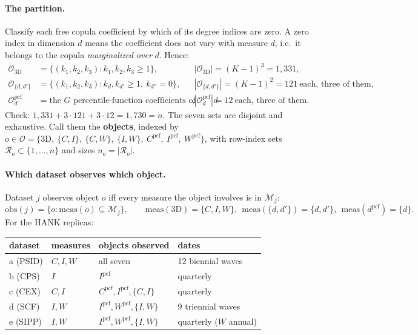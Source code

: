 \documentclass[11pt]{article}
\newcommand{\pcf}{\mathrm{pcf}}
\newcommand{\obs}{\mathrm{obs}}
\begin{document}
\paragraph{The partition.} Classify each free copula coefficient by which of its
degree indices are zero. A zero index in dimension $d$ means the coefficient
does not vary with measure $d$, i.e.\ it belongs to the copula
\emph{marginalized over} $d$. Hence:
\begin{equation}
\begin{aligned}
  \mathcal{O}_{\mathrm{3D}}  &= \{(k_1,k_2,k_3): k_1,k_2,k_3 \ge 1\}, &&|\mathcal{O}_{\mathrm{3D}}| = (K-1)^3 = 1{,}331, \\
  \mathcal{O}_{\{d,d'\}}     &= \{(k_1,k_2,k_3): k_d,k_{d'} \ge 1,\ k_{d''} = 0\}, &&|\mathcal{O}_{\{d,d'\}}| = (K-1)^2 = 121 \ \text{each, three of them},\\
  \mathcal{O}_{d}^{\pcf}     &= \text{the $G$ percentile-function coefficients of measure $d$}, &&|\mathcal{O}_d^{\pcf}| = 12 \ \text{each, three of them}.
\end{aligned}
\end{equation}
Check: $1{,}331 + 3\cdot 121 + 3\cdot 12 = 1{,}730 = n$. The seven sets are
disjoint and exhaustive. Call them the \textbf{objects}, indexed by
$o \in \mathcal{O} = \{\mathrm{3D},\ \{C,I\},\ \{C,W\},\ \{I,W\},\ C^{\pcf},\ I^{\pcf},\ W^{\pcf}\}$,
with row-index sets $\mathcal{R}_o \subset \{1,\ldots,n\}$ and sizes
$n_o = |\mathcal{R}_o|$.

\paragraph{Which dataset observes which object.} Dataset $j$ observes object $o$
iff every measure the object involves is in $\mathcal{M}_j$:
\begin{equation}
  \obs(j) = \bigl\{ o : \mathrm{meas}(o) \subseteq \mathcal{M}_j \bigr\},
  \qquad
  \mathrm{meas}(\mathrm{3D}) = \{C,I,W\},\ \ \mathrm{meas}(\{d,d'\}) = \{d,d'\},\ \ \mathrm{meas}(d^{\pcf}) = \{d\}.
\end{equation}
For the HANK replicas:

\begin{center}
\begin{tabular}{llll}
\toprule
dataset & measures & objects observed & dates \\
\midrule
a (PSID)  & $C,I,W$ & all seven                                & 12 biennial waves \\
b (CPS)   & $I$     & $I^{\pcf}$                              & quarterly \\
c (CEX)   & $C,I$   & $C^{\pcf}, I^{\pcf}, \{C,I\}$          & quarterly \\
d (SCF)   & $I,W$   & $I^{\pcf}, W^{\pcf}, \{I,W\}$          & 9 triennial waves \\
e (SIPP)  & $I,W$   & $I^{\pcf}, W^{\pcf}, \{I,W\}$          & quarterly ($W$ annual) \\
\bottomrule
\end{tabular}
\end{center}
\end{document}
